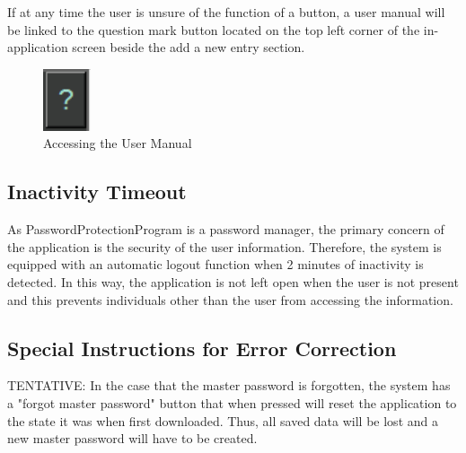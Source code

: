 \documentclass[12pt, titlepage]{article}
\begin{document}
If at any time the user is unsure of the function of a button, a user manual will be linked to the question mark button located on the top left corner of the in-application screen beside the add a new entry section.

\begin{figure}[h]
	\centering
	\includegraphics[scale=1.0]{images/UserManual.PNG}
	\caption{Accessing the User Manual}
	\label{fig:UsMan}
\end{figure}

\subsection{Inactivity Timeout} \label{InacTime}

As PasswordProtectionProgram is a password manager, the primary concern of the application is the security of the user information. Therefore, the system is equipped with an automatic logout function when 2 minutes of inactivity is detected. In this way, the application is not left open when the user is not present and this prevents individuals other than the user from accessing the information.

\subsection{Special Instructions for Error Correction} \label{ErrCorr}

TENTATIVE: In the case that the master password is forgotten, the system has a "forgot master password" button that when pressed will reset the application to the state it was when first downloaded. Thus, all saved data will be lost and a new master password will have to be created.

\newpage



\end{document}
